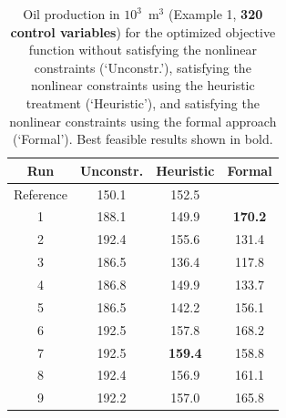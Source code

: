 \documentclass[twocolumn,numbook]{svjour3}          %
\begin{document}
             
\begin{table}
\centering
\caption{Oil production in $10^3$~m$^3$ (Example 1, {\bf 320 control variables}) for the optimized objective function
         without satisfying the nonlinear constraints (`Unconstr.'), satisfying the nonlinear constraints
         using the heuristic treatment (`Heuristic'), and satisfying the nonlinear constraints
         using the formal approach (`Formal'). Best feasible results shown in bold.}
\begin{tabular}{|c|c|c|c|}
\hline
   Run & Unconstr. & Heuristic & Formal                          \\
\hline
Reference             & 150.1         &  152.5                      &                     \\
1                     & 188.1         &  149.9                      &  \bf{ 170.2 }        \\
2                     & 192.4         &  155.6                      &         131.4            \\
3                     & 186.5         &  136.4                      &         117.8          \\
4                     & 186.8         &  149.9                      &         133.7          \\
5                     & 186.5         &  142.2                      &         156.1          \\
6                     & 192.5         &  157.8                      &         168.2          \\
7                     & 192.5         &  \bf{159.4}               &         158.8          \\ 
8                     & 192.4         &  156.9                      &         161.1          \\
9                     & 192.2         &  157.0                      &         165.8          \\
\hline
\end{tabular}
  \label{table:PiC500Steps64}
\end{table}
 
 
 
 

 
\end{document}
